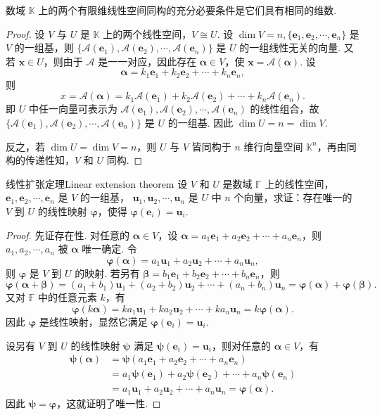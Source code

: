 \documentclass[12pt, a4paper,newtx]{ctexart}
\begin{document}
\begin{proposition}{}{}
	数域 $\mathbb{K}$ 上的两个有限维线性空间同构的充分必要条件是它们具有相同的维数. 
\end{proposition}
\begin{proof}
	设 $V$ 与 $U$ 是 $\mathbb{K}$ 上的两个线性空间，$V \cong U$. 设 $\dim V = n, \{\bm{e}_1, \bm{e}_2, \cdots, \bm{e}_n\}$ 是 $V$ 的一组基，则 $\{\mathcal{A}(\bm{e}_1), \mathcal{A}(\bm{e}_2), \cdots, \mathcal{A}(\bm{e}_n)\}$ 是 $U$ 的一组线性无关的向量. 又若 $\bm x \in U$，则由于 $\mathcal{A}$ 是一一对应，因此存在 $\bm{\alpha}\in V$，使 $\bm x = \mathcal{A}(\bm{\alpha})$. 设
	\[
	\bm{\alpha} = k_1\bm{e}_1 + k_2\bm{e}_2 + \cdots + k_n\bm{e}_n,
	\]
	则
	\[
	x = \mathcal{A}(\bm{\alpha}) = k_1\mathcal{A}(\bm{e}_1) + k_2\mathcal{A}(\bm{e}_2) + \cdots + k_n\mathcal{A}(\bm{e}_n). 
	\]
	即 $U$ 中任一向量可表示为 $\mathcal{A}(\bm{e}_1), \mathcal{A}(\bm{e}_2), \cdots, \mathcal{A}(\bm{e}_n)$ 的线性组合，故 $\{\mathcal{A}(\bm{e}_1), \mathcal{A}(\bm{e}_2), \cdots, \mathcal{A}(\bm{e}_n)\}$ 是 $U$ 的一组基. 因此 $\dim U = n = \dim V$. 
	
	反之，若 $\dim U = \dim V = n$，则 $U$ 与 $V$ 皆同构于 $n$ 维行向量空间 $\mathbb{K}^n$，再由同构的传递性知，$V$ 和 $U$ 同构. 
\end{proof}
\begin{theorem}{线性扩张定理}{Linear extension theorem}
	设 $V$ 和 $U$ 是数域 $\mathbb F$ 上的线性空间，$\bm e_1, \bm e_2, \cdots, \bm e_n$ 是 $V$ 的一组基，
	$\bm u_1, \bm u_2, \cdots, \bm u_n$ 是 $U$ 中 $n$ 个向量，求证：存在唯一的 $V$ 到 $U$ 的线性映射 $\bm \varphi$，使得 $\bm\varphi(\bm{e}_i) = \bm u_i$.
\end{theorem}
\begin{proof}
	先证存在性. 对任意的 $\bm{\alpha} \in V$，设 $\bm{\alpha} = a_1 \bm{e}_1 + a_2 \bm{e}_2 + \cdots + a_n \bm{e}_n$，则
	$a_1, a_2, \cdots, a_n$ 被 $\bm{\alpha}$ 唯一确定. 令
	\[
	\bm\varphi(\bm{\alpha}) = a_1 \bm{u}_1 + a_2 \bm{u}_2 + \cdots + a_n \bm{u}_n,
	\]
	则 $\bm\varphi$ 是 $V$ 到 $U$ 的映射. 若另有 $\bm\beta = b_1 \bm{e}_1 + b_2 \bm{e}_2 + \cdots + b_n \bm{e}_n$，则
	\[
	\bm\varphi(\bm{\alpha} + \bm\beta) = (a_1 + b_1) \bm{u}_1 + (a_2 + b_2) \bm{u}_2 + \cdots + (a_n + b_n) \bm{u}_n = \bm\varphi(\bm{\alpha}) + \bm\varphi(\bm\beta).
	\]
	又对 $\mathbb F$ 中的任意元素 $k$，有
	\[
	\bm\varphi(k\bm{\alpha}) = k a_1 \bm{u}_1 + k a_2 \bm{u}_2 + \cdots + k a_n \bm{u}_n = k \bm\varphi(\bm{\alpha}).
	\]
	因此 $\bm\varphi$ 是线性映射，显然它满足 $\bm\varphi(\bm{e}_i) = \bm{u}_i$.
	
	设另有 $V$ 到 $U$ 的线性映射 $\bm\psi$ 满足 $\bm\psi(\bm{e}_i) = \bm{u}_i$，则对任意的 $\bm{\alpha} \in V$，有\begin{align*}
		\bm\psi(\bm{\alpha}) &= \bm\psi(a_1 \bm{e}_1 + a_2 \bm{e}_2 + \cdots + a_n \bm{e}_n)\\&= a_1 \bm\psi(\bm{e}_1) + a_2 \bm\psi(\bm{e}_2) + \cdots + a_n \bm\psi(\bm{e}_n)\\&=a_1 \bm{u}_1 + a_2 \bm{u}_2 + \cdots + a_n \bm{u}_n = \bm\varphi(\bm{\alpha}).
	\end{align*}
	因此 $\bm\psi = \bm\varphi$，这就证明了唯一性. 
\end{proof}
\end{document}
